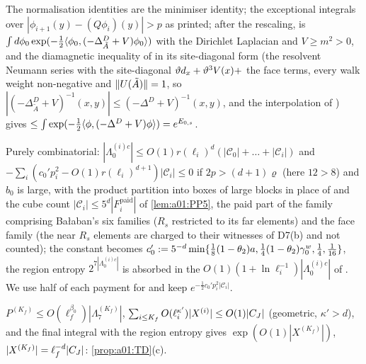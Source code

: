 \begin{description}[leftmargin=1.5em,style=nextline]
\item[{D13 (integration of the block fields; \cite[(3.32)--(3.38)]{Ba2})}] The normalisation identities are the minimiser identity; the exceptional integrals over $|\phi_{i+1}(y)-(Q\phi_i)(y)|>p$ as printed; after the rescaling, \cite[(3.37)]{Ba2} is $\int d\phi_0\exp(-\frac12\langle \phi_0,(-\Delta^D_{\tilde A}+V)\phi_0\rangle)$ with the Dirichlet Laplacian and $V\ge m^2>0$, and the diamagnetic inequality of \cite[Sect.~3.1, (3.4)--(3.7)]{BFS1} in its site-diagonal form (the resolvent Neumann series with the site-diagonal $\vartheta d_x+\vartheta^3V(x)+$ the face terms, every walk weight non-negative and $\lVert U(\tilde A)\rVert=1$, so $|(-\Delta^D_{\tilde A}+V)^{-1}(x,y)|\le(-\Delta^D+V)^{-1}(x,y)$, and the interpolation of \cite[Sect.~3.3, (3.16)--(3.17)]{BFS1}) gives $\le\int\exp(-\frac12\langle \phi,(-\Delta^D+V)\phi\rangle)=e^{E_{0,s}}$.
\item[{D14 (combinatorics; \cite[Sect.~3C, (3.51)--(3.54)]{Ba2})}] Purely combinatorial: $|\Lambda_0^{(i)c}|\le O(1)r(\ell_i)^d(|\mathcal C_0|+\dots+|\mathcal C_i|)$ and $-\sum_i(c_0'p_i^2-O(1)r(\ell_i)^{d+1})|\mathcal C_i|\le0$ if $2p>(d+1)\varrho$ (here $12>8$) and $b_0$ is large, with the product partition into boxes of large blocks in place of \cite[(3.43)--(3.45)]{Ba2} and the cube count $|\mathcal C_i|\le5^d|F_i^{\mathrm{paid}}|$ of \cref{lem:a01:PP5}, the paid part of the family comprising Ba{\l}aban's six families ($R_s$ restricted to its far elements) and the face family (the near $R_s$ elements are charged to their witnesses of D7(b) and not counted); the constant becomes $c_0':=5^{-d}\min\{\frac18(1-\theta_2)a,\frac14(1-\theta_2)\gamma_0^w,\frac14,\frac1{16}\}$, the region entropy $2^{7|\Lambda_0^{(i)c}|}$ is absorbed in the $O(1)(1+\ln\ell_i^{-1})|\Lambda_0^{(i)c}|$ of \cite[(3.47)]{Ba2}. We use half of each payment for \cite[(3.54)]{Ba2} and keep $e^{-\frac12c_0'p_i^2|\mathcal C_i|}$.
\item[{D15 (final step; \cite[(2.116)--(2.118)]{Ba2})}] $P^{(K_f)}\le O(\ell_f^{\beta_0})|\Lambda_7^{(K_f)}|$, $\sum_{i\le K_f}O(\ell_i^{\kappa'})|X^{(i)}|\le O(1)|C_J|$ (geometric, $\kappa'>d$), and the final integral with the region entropy gives $\exp(O(1)|X^{(K_f)}|)$, $|X^{(K_f)}|=\ell_f^{-d}|C_J|$: \cref{prop:a01:TD}(c).
\end{description}

